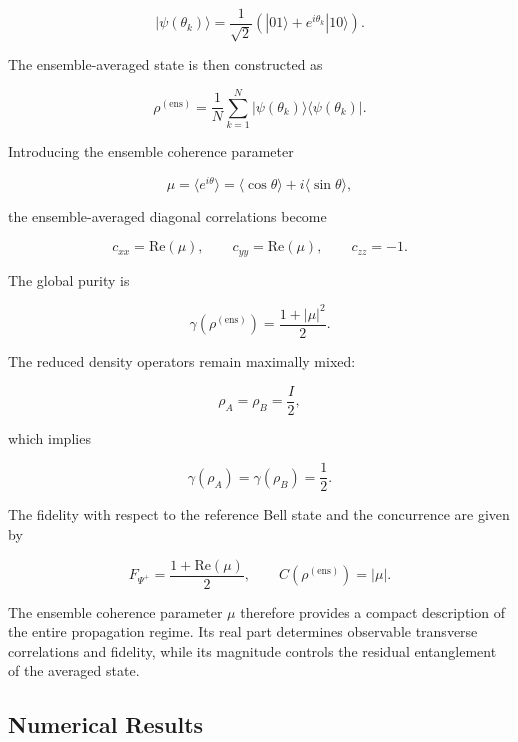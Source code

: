 \begin{equation}
|\psi(\theta_k)\rangle
=
\frac{1}{\sqrt{2}}
\left(
|01\rangle + e^{i\theta_k}|10\rangle
\right).
\label{eq:random_phase_realization}
\end{equation}

The ensemble-averaged state is then constructed as

\begin{equation}
\rho^{\mathrm{(ens)}}
=
\frac{1}{N}
\sum_{k=1}^{N}
|\psi(\theta_k)\rangle
\langle\psi(\theta_k)|.
\label{eq:random_phase_ensemble_density_operator}
\end{equation}

Introducing the ensemble coherence parameter

\begin{equation}
\mu
=
\langle e^{i\theta} \rangle
=
\langle \cos\theta \rangle
+
i
\langle \sin\theta \rangle,
\label{eq:ensemble_coherence_parameter}
\end{equation}

the ensemble-averaged diagonal correlations become

\[
c_{xx}
=
\mathrm{Re}(\mu),
\qquad
c_{yy}
=
\mathrm{Re}(\mu),
\qquad
c_{zz}
=
-1.
\]

The global purity is

\[
\gamma(\rho^{\mathrm{(ens)}})
=
\frac{1 + |\mu|^2}{2}.
\]

The reduced density operators remain maximally mixed:

\[
\rho_A
=
\rho_B
=
\frac{I}{2},
\]

which implies

\[
\gamma(\rho_A)
=
\gamma(\rho_B)
=
\frac{1}{2}.
\]

The fidelity with respect to the reference Bell state and the concurrence are given by

\[
F_{\Psi^+}
=
\frac{1 + \mathrm{Re}(\mu)}{2},
\qquad
C(\rho^{\mathrm{(ens)}})
=
|\mu|.
\]

\medskip

The ensemble coherence parameter \( \mu \) therefore provides a compact description of the entire propagation regime. Its real part determines observable transverse correlations and fidelity, while its magnitude controls the residual entanglement of the averaged state.


\subsection*{Numerical Results}


